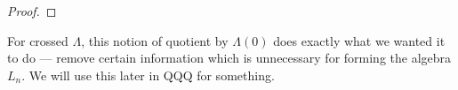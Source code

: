 \documentclass{amsbook} %
\numberwithin{section}{chapter}
\begin{document}
\begin{proof}
%
\end{proof}

For crossed $\Lambda$, this notion of quotient by $\Lambda(0)$ does exactly what we wanted it to do --- remove certain information which is unnecessary for forming the algebra $L_n$. We will use this later in QQQ for something.
\end{document}
